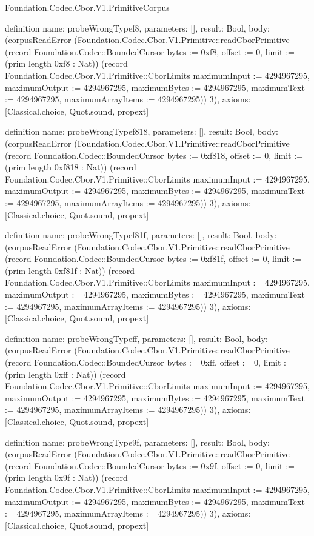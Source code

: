 \begin{lexlean}{Foundation.Codec.Cbor.V1.PrimitiveCorpus}
\begin{semanticmodule}
definition{
  name: probeWrongTypef8,
  parameters: [],
  result: Bool,
  body: (corpusReadError (Foundation.Codec.Cbor.V1.Primitive::readCborPrimitive (record Foundation.Codec::BoundedCursor {bytes := 0xf8, offset := 0, limit := (prim length 0xf8 : Nat)}) (record Foundation.Codec.Cbor.V1.Primitive::CborLimits {maximumInput := 4294967295, maximumOutput := 4294967295, maximumBytes := 4294967295, maximumText := 4294967295, maximumArrayItems := 4294967295})) 3),
  axioms: [Classical.choice, Quot.sound, propext]
}

definition{
  name: probeWrongTypef818,
  parameters: [],
  result: Bool,
  body: (corpusReadError (Foundation.Codec.Cbor.V1.Primitive::readCborPrimitive (record Foundation.Codec::BoundedCursor {bytes := 0xf818, offset := 0, limit := (prim length 0xf818 : Nat)}) (record Foundation.Codec.Cbor.V1.Primitive::CborLimits {maximumInput := 4294967295, maximumOutput := 4294967295, maximumBytes := 4294967295, maximumText := 4294967295, maximumArrayItems := 4294967295})) 3),
  axioms: [Classical.choice, Quot.sound, propext]
}

definition{
  name: probeWrongTypef81f,
  parameters: [],
  result: Bool,
  body: (corpusReadError (Foundation.Codec.Cbor.V1.Primitive::readCborPrimitive (record Foundation.Codec::BoundedCursor {bytes := 0xf81f, offset := 0, limit := (prim length 0xf81f : Nat)}) (record Foundation.Codec.Cbor.V1.Primitive::CborLimits {maximumInput := 4294967295, maximumOutput := 4294967295, maximumBytes := 4294967295, maximumText := 4294967295, maximumArrayItems := 4294967295})) 3),
  axioms: [Classical.choice, Quot.sound, propext]
}

definition{
  name: probeWrongTypeff,
  parameters: [],
  result: Bool,
  body: (corpusReadError (Foundation.Codec.Cbor.V1.Primitive::readCborPrimitive (record Foundation.Codec::BoundedCursor {bytes := 0xff, offset := 0, limit := (prim length 0xff : Nat)}) (record Foundation.Codec.Cbor.V1.Primitive::CborLimits {maximumInput := 4294967295, maximumOutput := 4294967295, maximumBytes := 4294967295, maximumText := 4294967295, maximumArrayItems := 4294967295})) 3),
  axioms: [Classical.choice, Quot.sound, propext]
}

definition{
  name: probeWrongType9f,
  parameters: [],
  result: Bool,
  body: (corpusReadError (Foundation.Codec.Cbor.V1.Primitive::readCborPrimitive (record Foundation.Codec::BoundedCursor {bytes := 0x9f, offset := 0, limit := (prim length 0x9f : Nat)}) (record Foundation.Codec.Cbor.V1.Primitive::CborLimits {maximumInput := 4294967295, maximumOutput := 4294967295, maximumBytes := 4294967295, maximumText := 4294967295, maximumArrayItems := 4294967295})) 3),
  axioms: [Classical.choice, Quot.sound, propext]
}


\end{semanticmodule}
\end{lexlean}
